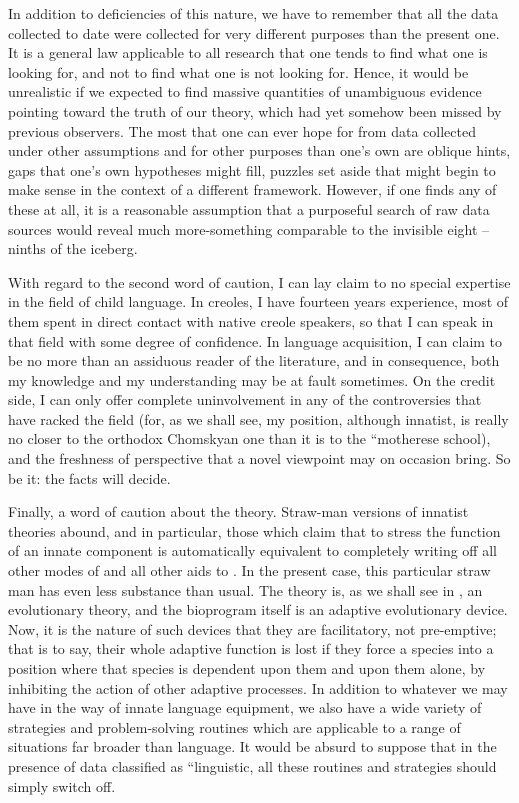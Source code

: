 In addition to deficiencies of this nature, we have to remember that all the data collected to date were collected for very different purposes than the present one. It is a general law applicable to all research that one tends to find what one is looking for, and not to find what one is not looking for. Hence, it would be unrealistic if we expected to find massive quantities of unambiguous evidence pointing toward the truth of our theory, which had yet somehow been missed by previous observers. The most that one can ever hope for from data collected under other assumptions and for other purposes than one's own are oblique hints, gaps that one's own hypotheses might fill, puzzles set aside that might begin to make sense in the context of a different framework. However, if one finds any of these at all, it is a reasonable assumption that a purposeful search of raw data sources would reveal much more-something comparable to the invisible eight -- ninths of the iceberg.

With regard to the second word of caution, I can lay claim to no special expertise in the field of child language. In creoles, I have fourteen years experience, most of them spent in direct contact with native creole speakers, so that I can speak in that field with some degree of confidence. In language acquisition, I can claim to be no more than an assiduous reader of the literature, and in consequence, both my knowledge and my understanding may be at fault sometimes. On the credit side, I can only offer complete uninvolvement in any of the controversies that have racked the field (for, as we shall see, my position, although innatist, is really no closer to the orthodox Chomskyan one than it is to the ``motherese school), and the freshness of perspective that a novel viewpoint may on occasion bring. So be it: the facts will decide.

Finally, a word of caution about the theory. Straw-man versions
of innatist theories abound, and in particular, those which claim that to stress the function of an innate component  is automatically equivalent to completely writing off all other modes of  and all other aids to . In the present case, this particular straw man has even less substance than usual. The  theory is, as we shall see in , an evolutionary theory, and the bioprogram itself is an adaptive evolutionary device. Now, it is the nature of such devices that they are facilitatory, not pre-emptive; that is to say, their whole adaptive function is lost if they force a species into a position where that species is dependent upon them and upon them alone, by inhibiting the action of other adaptive processes. In addition to whatever we may have in the way of innate language equipment, we also have a wide variety of  strategies and problem-solving routines which are applicable to a range of situations far broader than language. It would be absurd to suppose that in the presence of data classified as ``linguistic, all these routines and strategies should simply switch off.

